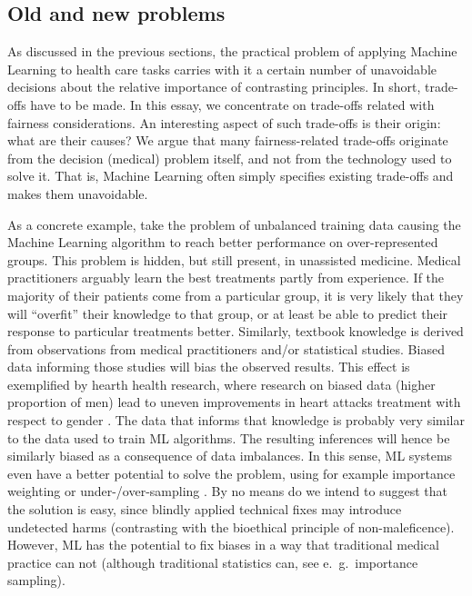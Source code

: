 \subsection{Old and new problems}
As discussed in the previous sections, the practical problem of applying Machine Learning to health care tasks carries with it a certain number of unavoidable decisions about the relative importance of contrasting principles.
In short, trade-offs have to be made.
In this essay, we concentrate on trade-offs related with fairness considerations.
An interesting aspect of such trade-offs is their origin: what are their causes?
We argue that many fairness-related trade-offs originate from the decision (medical) problem itself, and not from the technology used to solve it.
That is, Machine Learning often simply specifies existing trade-offs and makes them unavoidable.

As a concrete example, take the problem of unbalanced training data causing the Machine Learning algorithm to reach better performance on over-represented groups.
This problem is hidden, but still present, in unassisted medicine.
Medical practitioners arguably learn the best treatments partly from experience.
If the majority of their patients come from a particular group, it is very likely that they will ``overfit'' their knowledge to that group, or at least be able to predict their response to particular treatments better.
Similarly, textbook knowledge is derived from observations from medical practitioners and/or statistical studies.
Biased data informing those studies will bias the observed results.
This effect is exemplified by hearth health research, where research on biased data (higher proportion of men) lead to uneven improvements in heart attacks treatment with respect to gender \cite[e221]{Mccradden2020}.
The data that informs that knowledge is probably very similar to the data used to train ML algorithms.
The resulting inferences will hence be similarly biased as a consequence of data imbalances.
In this sense, ML systems even have a better potential to solve the problem, using for example importance weighting or under-/over-sampling \cite[pp.~6-8]{Chen2021}.
By no means do we intend to suggest that the solution is easy, since blindly applied technical fixes may introduce undetected harms (contrasting with the bioethical principle of non-maleficence).
However, ML has the potential to fix biases in a way that traditional medical practice can not \cite[p.~e222]{Mccradden2020} (although traditional statistics can, see e.~g.~importance sampling).

